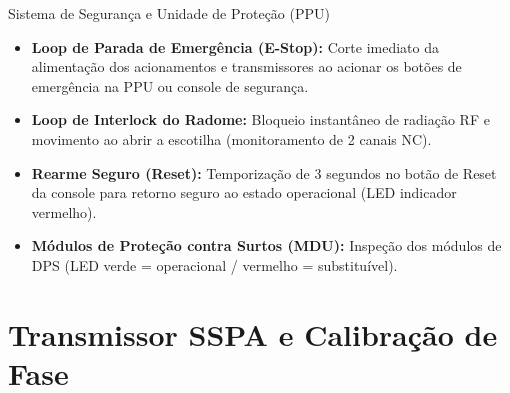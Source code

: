 ﻿\documentclass[aspectratio=169]{beamer}
\begin{document}
\begin{frame}{Sistema de Seguran{\c{c}}a e Unidade de Prote{\c{c}}{\~a}o (PPU)}
    \begin{itemize}
        \item \textbf{Loop de Parada de Emerg{\^e}ncia (E-Stop):} Corte imediato da alimenta{\c{c}}{\~a}o dos acionamentos e transmissores ao acionar os bot{\~o}es de emerg{\^e}ncia na PPU ou console de seguran{\c{c}}a.
        \item \textbf{Loop de Interlock do Radome:} Bloqueio instant{\^a}neo de radia{\c{c}}{\~a}o RF e movimento ao abrir a escotilha (monitoramento de 2 canais NC).
        \item \textbf{Rearme Seguro (Reset):} Temporiza{\c{c}}{\~a}o de 3 segundos no bot{\~a}o de Reset da console para retorno seguro ao estado operacional (LED indicador vermelho).
        \item \textbf{M{\'o}dulos de Prote{\c{c}}{\~a}o contra Surtos (MDU):} Inspe{\c{c}}{\~a}o dos m{\'o}dulos de DPS (LED verde = operacional / vermelho = substitu{\'i}vel).
    \end{itemize}
\end{frame}

\section{Transmissor SSPA e Calibra{\c{c}}{\~a}o de Fase}
\end{document}
